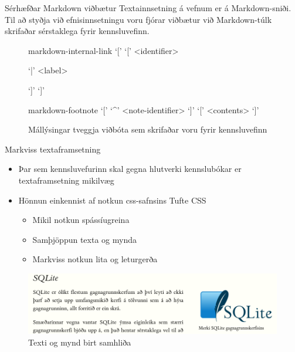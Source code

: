 \documentclass{beamer}
\begin{document}
\begin{frame}{Sérhæfðar Markdown viðbætur}
Textainnsetning á vefnum er á Markdown-sniði. Til að styðja við efnisinnsetningu voru fjórar viðbætur við Markdown-túlk skrifaðar sérstaklega fyrir kennsluvefinn.
\begin{center}
    \begin{minipage}{0.9\textwidth}
        \begin{figure}
            \caption{Mállýsingar tveggja viðbóta sem skrifaðar voru fyrir kennsluvefinn}
            \label{fig:markdown-internal-link}
            \begin{syntaxenv}{markdown-internal-link}
                `[' `[' <identifier>
                \begin{stack}
                    `|' <label>\\
                \end{stack}
                `]' `]'
            \end{syntaxenv}
            \begin{syntaxenv}{markdown-footnote}
                `[' `\textasciicircum' <note-identifier> `]' `[' <contents> `]'
            \end{syntaxenv}
        \end{figure}
    \end{minipage}
\end{center}
\end{frame}

\begin{frame}{Markviss textaframsetning}
    \begin{itemize}
        \item Þar sem kennsluvefurinn skal gegna hlutverki kennslubókar er textaframsetning mikilvæg
        \item Hönnun einkennist af notkun css-safnsins Tufte CSS 
        \begin{itemize}
            \item Mikil notkun spássíugreina
            \item Samþjöppun texta og mynda
            \item Markviss notkun lita og leturgerða
        \end{itemize}
    \end{itemize}
    \begin{figure}
        \caption{Texti og mynd birt samhliða}
        \includegraphics[width=\linewidth]{sqlite}
    \end{figure}
\end{frame}
\end{document}
